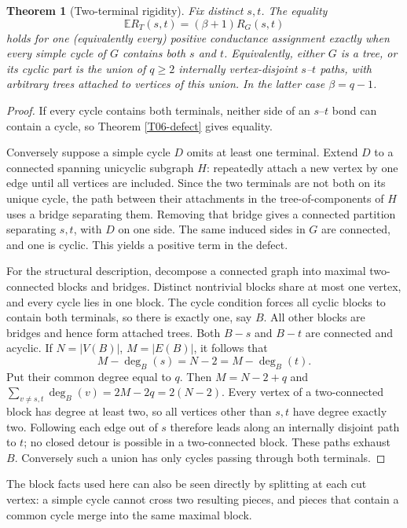 \documentclass[11pt,a4paper]{article}
\newtheorem{theorem}{Theorem}[section]
\theoremstyle{definition}\newtheorem{definition}[theorem]{Definition}
\theoremstyle{remark}\newtheorem{remark}[theorem]{Remark}
\numberwithin{equation}{section}
\begin{document}
\begin{theorem}[Two-terminal rigidity]\label{T06-theta}
Fix distinct $s,t$. The equality
\[
 \mathbb E R_T(s,t)=(\beta+1)R_G(s,t)
\]
holds for one (equivalently every) positive conductance assignment exactly when every simple cycle of $G$ contains both $s$ and $t$. Equivalently, either $G$ is a tree, or its cyclic part is the union of $q\ge2$ internally vertex-disjoint $s$--$t$ paths, with arbitrary trees attached to vertices of this union. In the latter case $\beta=q-1$.
\end{theorem}
\begin{proof}
If every cycle contains both terminals, neither side of an $s$--$t$ bond can contain a cycle, so Theorem \ref{T06-defect} gives equality.

Conversely suppose a simple cycle $D$ omits at least one terminal. Extend $D$ to a connected spanning unicyclic subgraph $H$: repeatedly attach a new vertex by one edge until all vertices are included. Since the two terminals are not both on its unique cycle, the path between their attachments in the tree-of-components of $H$ uses a bridge separating them. Removing that bridge gives a connected partition separating $s,t$, with $D$ on one side. The same induced sides in $G$ are connected, and one is cyclic. This yields a positive term in the defect.

For the structural description, decompose a connected graph into maximal two-connected blocks and bridges. Distinct nontrivial blocks share at most one vertex, and every cycle lies in one block. The cycle condition forces all cyclic blocks to contain both terminals, so there is exactly one, say $B$. All other blocks are bridges and hence form attached trees. Both $B-s$ and $B-t$ are connected and acyclic. If $N=|V(B)|$, $M=|E(B)|$, it follows that
\[
 M-\deg_B(s)=N-2=M-\deg_B(t).
\]
Put their common degree equal to $q$. Then $M=N-2+q$ and
$\sum_{v\ne s,t}\deg_B(v)=2M-2q=2(N-2)$.
Every vertex of a two-connected block has degree at least two, so all vertices other than $s,t$ have degree exactly two. Following each edge out of $s$ therefore leads along an internally disjoint path to $t$; no closed detour is possible in a two-connected block. These paths exhaust $B$. Conversely such a union has only cycles passing through both terminals.
\end{proof}
The block facts used here can also be seen directly by splitting at each cut vertex: a simple cycle cannot cross two resulting pieces, and pieces that contain a common cycle merge into the same maximal block.
\end{document}
